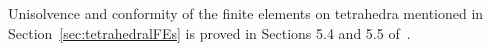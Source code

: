 \begin{remark}
  Unisolvence and conformity of the finite elements on tetrahedra mentioned in
  Section~\ref{sec:tetrahedralFEs}
  is proved in Sections 5.4 and 5.5 of~\cite{monk}.
\end{remark}
